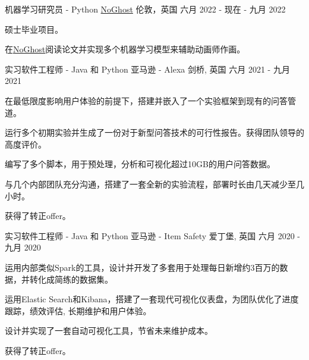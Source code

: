 

\begin{cventries}

    \cventry
    {机器学习研究员 - Python} %
    {\href{https://www.noghost.co.uk/}{NoGhost}} %
    {伦敦，英国} %
    {六月 2022 - 现在 - 九月 2022} %
    {
      \begin{cvitems} %
        \item {硕士毕业项目。}
        \item {在\href{https://www.noghost.co.uk/}{NoGhost}阅读论文并实现多个机器学习模型来辅助动画师作画。}
      \end{cvitems}
    }

  \cventry
    {实习软件工程师 - Java 和 Python} %
    {亚马逊 - Alexa} %
    {剑桥, 英国} %
    {六月 2021 - 九月 2021} %
    {
      \begin{cvitems} %
        \item {在最低限度影响用户体验的前提下，搭建并嵌入了一个实验框架到现有的问答管道。}
        \item {运行多个初期实验并生成了一份对于新型问答技术的可行性报告。获得团队领导的高度评价。}
        \item {编写了多个脚本，用于预处理，分析和可视化超过10GB的用户问答数据。}
        \item {与几个内部团队充分沟通，搭建了一套全新的实验流程，部署时长由几天减少至几小时。}
        \item {获得了转正offer。}
      \end{cvitems}
    }

  \cventry
    {实习软件工程师 - Java 和 Python} %
    {亚马逊 - Item Safety} %
    {爱丁堡, 英国} %
    {六月 2020 - 九月 2020} %
    {
      \begin{cvitems} %
        \item {运用内部类似Spark的工具，设计并开发了多套用于处理每日新增约3百万的数据，并转化成简练的数据集。}
        \item {运用Elastic Search和Kibana，搭建了一套现代可视化仪表盘，为团队优化了进度跟踪，绩效评估, 长期维护和用户体验。}
        \item {设计并实现了一套自动可视化工具，节省未来维护成本。}
        \item {获得了转正offer。}
      \end{cvitems}
    }


\end{cventries}
